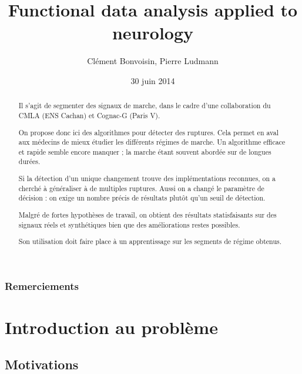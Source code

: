 \documentclass[french,11pt,notitlepage]{report}
\begin{document}
	\title{Functional data analysis applied to neurology}
	\author{Clément Bonvoisin, Pierre Ludmann}
	\date{30 juin 2014}
	\maketitle

	\begin{abstract}
  
Il s'agit de segmenter des signaux de marche,
dans le cadre d'une collaboration du CMLA (ENS Cachan) et Cognac-G (Paris V).

On propose donc ici des algorithmes pour détecter des ruptures.
Cela permet en aval aux médecins de mieux étudier les différents régimes de marche.
Un algorithme efficace et rapide semble encore manquer ;
la marche étant souvent abordée sur de longues durées.

Si la détection d'un unique changement trouve des implémentations reconnues,
on a cherché à généraliser à de multiples ruptures.
Aussi on a changé le paramètre de décision :
on exige un nombre précis de résultats plutôt qu'un seuil de détection.

Malgré de fortes hypothèses de travail,
on obtient des résultats statisfaisants sur des signaux réels et synthétiques
bien que des améliorations restes possibles.

Son utilisation doit faire place à un apprentissage sur les segments de régime obtenus.
	
	\end{abstract}

\phantom{kcahkcah}

\subsection*{Remerciements}






	\tableofcontents



	\chapter{Introduction au problème}
	
	
	
	\section{Motivations}
	
\end{document}
